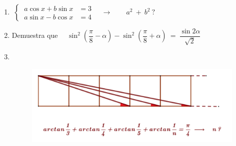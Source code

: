 \begin{enumerate}
\item $\ \begin{cases} \ a\cos x+b\sin x &= 3 \\ \ a\sin x - b\cos x &=4 \end{cases} \quad \longrightarrow \qquad a^2\ + \ b^2 \ ?$


\vspace{-4mm}
\begin{flushright}
\begin{footnotesize} \textcolor{gris}{}	\end{footnotesize}
\end{flushright}




\item	Demuestra que $\quad \sin^2 \left( \dfrac \pi 8 - \alpha \right) - \sin^2 \left( \dfrac \pi 8 + \alpha \right) \ = \ \dfrac{\sin 2 \alpha}{\sqrt{2}}$

\vspace{-2mm}
\begin{flushright}
\begin{footnotesize} \textcolor{gris}{}	\end{footnotesize}
\end{flushright}


\item $\ $

\begin{figure}[H]
	\centering
	\includegraphics[width=.75\textwidth]{img-ft/ft11.png}
	\end{figure}


\vspace{-12mm}
\begin{flushright}
\begin{tiny} \textcolor{gris}{}	\end{tiny}
\end{flushright}
\vspace{-11mm}
\begin{flushright}
\begin{tiny} \textcolor{gris}{}	\end{tiny}
\end{flushright}





\end{enumerate}
